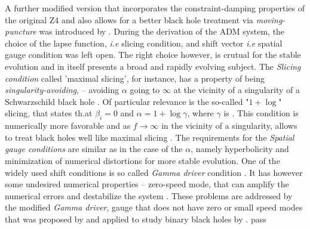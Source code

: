 {    A further modified version that incorporates the constraint-damping properties of the original Z4 and also allows for a better black hole treatment via \textit{moving-puncture} was introduced by \cite{Alic:2011gg}.
    During the derivation of the ADM system, the choice of the lapse function, \textit{i.e} slicing condition, and shift vector \textit{i.e} spatial gauge condition was left open. The right choice however, is crutual for the stable evolution and in itself presents a broad and rapidly evolving subject.
    The \textit{Slicing condition} called 'maximal slicing', for instance, has a property of being \textit{singularity-avoiding}, -- avoiding $\alpha$ going to $\infty$ at the vicinity of a singularity of a Schwarzschild black hole \cite{Geyer:1995}.
    Of particular relevance is the so-called "$1 + \log$" slicing, that states th.at $\beta_i=0$ and $\alpha = 1 + \log\gamma$, where $\gamma$ is . This condition is numerically more favorable and as $f\rightarrow\infty$ in the vicinity of a singularity, allows to treat black holes well like maximal slicing \cite{Baumgarte:2002jm}.
    The requirements for the \textit{Spatial gauge conditions} are similar as in the case of the $\alpha$, namely hyperbolicity and minimization of numerical distortions for more stable evolution. 
    One of the widely used shift conditions is so called \textit{Gamma driver} condition \cite{Alcubierre:2002kk}. It has however some undesired numerical properties -- zero-speed mode, that can amplify the numerical errors and destabilize the system \cite{vanMeter:2006vi}. These problems are addressed by the modified \textit{Gamma driver}, gauge that does not have zero or small speed modes that was proposed by \cite{vanMeter:2006vi} and applied to study binary black holes by \cite{Campanelli:2005dd}.
}{
    pass
}